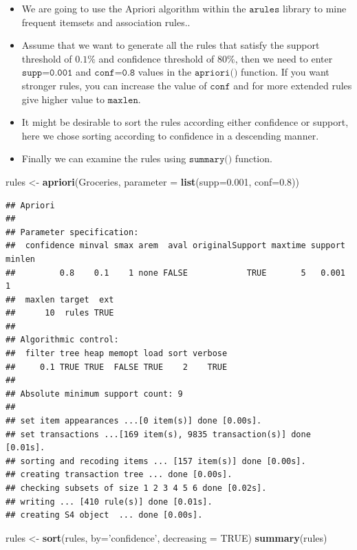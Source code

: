 \documentclass[
]{book}
\newenvironment{Shaded}{\begin{snugshade}}{\end{snugshade}}
\newcommand{\DataTypeTok}[1]{\textcolor[rgb]{0.13,0.29,0.53}{#1}}
\newcommand{\FloatTok}[1]{\textcolor[rgb]{0.00,0.00,0.81}{#1}}
\newcommand{\KeywordTok}[1]{\textcolor[rgb]{0.13,0.29,0.53}{\textbf{#1}}}
\newcommand{\NormalTok}[1]{#1}
\newcommand{\OtherTok}[1]{\textcolor[rgb]{0.56,0.35,0.01}{#1}}
\newcommand{\StringTok}[1]{\textcolor[rgb]{0.31,0.60,0.02}{#1}}
\begin{document}
\begin{itemize}
\item
  We are going to use the Apriori algorithm within the \(\texttt{arules}\) library to mine frequent itemsets and association rules..
\item
  Assume that we want to generate all the rules that satisfy the support threshold of \(0.1\%\) and confidence threshold of \(80\%\), then we need to enter \(\texttt{supp=0.001}\) and \(\texttt{conf=0.8}\) values in the \(\texttt{apriori()}\) function. If you want stronger rules, you can increase the value of \(\texttt{conf}\) and for more extended rules give higher value to \(\texttt{maxlen}\).
\item
  It might be desirable to sort the rules according either confidence or support, here we chose sorting according to confidence in a descending manner.
\item
  Finally we can examine the rules using \(\texttt{summary()}\) function.
\end{itemize}

\begin{Shaded}
\begin{Highlighting}[]
\NormalTok{rules <-}\StringTok{ }\KeywordTok{apriori}\NormalTok{(Groceries, }\DataTypeTok{parameter =} \KeywordTok{list}\NormalTok{(}\DataTypeTok{supp=}\FloatTok{0.001}\NormalTok{, }\DataTypeTok{conf=}\FloatTok{0.8}\NormalTok{))}
\end{Highlighting}
\end{Shaded}

\begin{verbatim}
## Apriori
## 
## Parameter specification:
##  confidence minval smax arem  aval originalSupport maxtime support minlen
##         0.8    0.1    1 none FALSE            TRUE       5   0.001      1
##  maxlen target  ext
##      10  rules TRUE
## 
## Algorithmic control:
##  filter tree heap memopt load sort verbose
##     0.1 TRUE TRUE  FALSE TRUE    2    TRUE
## 
## Absolute minimum support count: 9 
## 
## set item appearances ...[0 item(s)] done [0.00s].
## set transactions ...[169 item(s), 9835 transaction(s)] done [0.01s].
## sorting and recoding items ... [157 item(s)] done [0.00s].
## creating transaction tree ... done [0.00s].
## checking subsets of size 1 2 3 4 5 6 done [0.02s].
## writing ... [410 rule(s)] done [0.01s].
## creating S4 object  ... done [0.00s].
\end{verbatim}

\begin{Shaded}
\begin{Highlighting}[]
\NormalTok{rules <-}\StringTok{ }\KeywordTok{sort}\NormalTok{(rules, }\DataTypeTok{by=}\StringTok{'confidence'}\NormalTok{, }\DataTypeTok{decreasing =} \OtherTok{TRUE}\NormalTok{)}
\KeywordTok{summary}\NormalTok{(rules)}
\end{Highlighting}
\end{Shaded}
\end{document}
